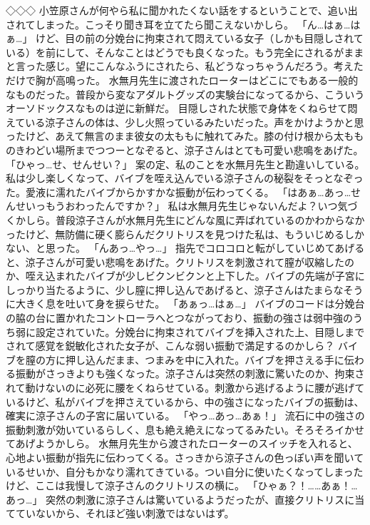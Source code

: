 ◇◇◇
小笠原さんが何やら私に聞かれたくない話をするということで、追い出されてしまった。こっそり聞き耳を立てたら聞こえないかしら。
「ん…はぁ…はぁ…」
けど、目の前の分娩台に拘束されて悶えている女子（しかも目隠しされている）を前にして、そんなことはどうでも良くなった。もう完全にされるがままと言った感じ。望にこんなふうにされたら、私どうなっちゃうんだろう。考えただけで胸が高鳴った。
水無月先生に渡されたローターはどこにでもある一般的なものだった。普段から変なアダルトグッズの実験台になってるから、こういうオーソドックスなものは逆に新鮮だ。
目隠しされた状態で身体をくねらせて悶えている涼子さんの体は、少し火照っているみたいだった。声をかけようかと思ったけど、あえて無言のまま彼女の太ももに触れてみた。膝の付け根から太もものきわどい場所までつつーとなぞると、涼子さんはとても可愛い悲鳴をあげた。
「ひゃっ…せ、せんせい？」
案の定、私のことを水無月先生と勘違いしている。私は少し楽しくなって、バイブを咥え込んでいる涼子さんの秘裂をそっとなぞった。愛液に濡れたバイブからかすかな振動が伝わってくる。
「はあぁ…あっ…せんせいっもうおわったんですか？」
私は水無月先生じゃないんだよ？いつ気づくかしら。普段涼子さんが水無月先生にどんな風に弄ばれているのかわからなかったけど、無防備に硬く膨らんだクリトリスを見つけた私は、もういじめるしかない、と思った。
「んあっ…やっ…」
指先でコロコロと転がしていじめてあげると、涼子さんが可愛い悲鳴をあげた。クリトリスを刺激されて膣が収縮したのか、咥え込まれたバイブが少しビクンビクンと上下した。バイブの先端が子宮にしっかり当たるように、少し膣に押し込んであげると、涼子さんはたまらなそうに大きく息を吐いて身を捩らせた。
「あぁっ…はぁ…」
バイブのコードは分娩台の脇の台に置かれたコントローラへとつながっており、振動の強さは弱中強のうち弱に設定されていた。分娩台に拘束されてバイブを挿入された上、目隠しまでされて感覚を鋭敏化された女子が、こんな弱い振動で満足するのかしら？
バイブを膣の方に押し込んだまま、つまみを中に入れた。バイブを押さえる手に伝わる振動がさっきよりも強くなった。涼子さんは突然の刺激に驚いたのか、拘束されて動けないのに必死に腰をくねらせている。刺激から逃げるように腰が逃げているけど、私がバイブを押さえているから、中の強さになったバイブの振動は、確実に涼子さんの子宮に届いている。
「やっ…あっ…あぁ！」
流石に中の強さの振動刺激が効いているらしく、息も絶え絶えになってるみたい。そろそろイかせてあげようかしら。
水無月先生から渡されたローターのスイッチを入れると、心地よい振動が指先に伝わってくる。さっきから涼子さんの色っぽい声を聞いているせいか、自分もかなり濡れてきている。つい自分に使いたくなってしまったけど、ここは我慢して涼子さんのクリトリスの横に。
「ひゃぁ？！……あぁ！…あっ…」
突然の刺激に涼子さんは驚いているようだったが、直接クリトリスに当てていないから、それほど強い刺激ではないはず。
